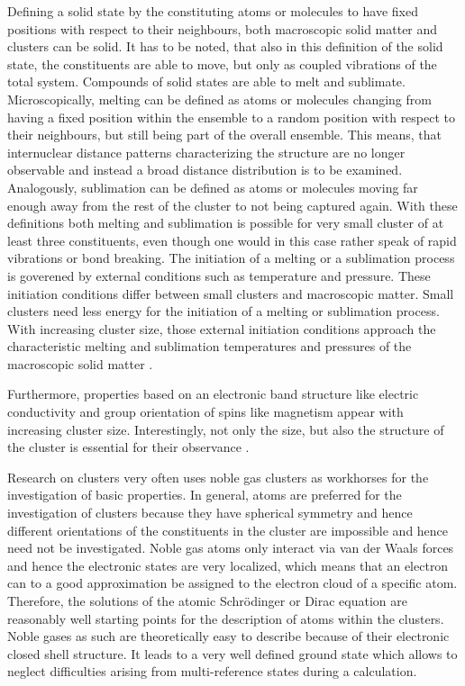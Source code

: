 Defining a solid state by the constituting atoms or molecules to have fixed
positions with respect to their neighbours, both macroscopic solid matter
and clusters can be solid. It has to be noted, that also in this definition
of the solid state, the constituents are able to move, but only as coupled
vibrations of the total system.
Compounds of solid states are able to melt and sublimate. Microscopically, melting 
can be defined as atoms or                                       
molecules changing from having a fixed position within the ensemble to a          
random position with respect to their neighbours, but still being part
of the overall ensemble. This means, that internuclear distance
patterns characterizing the
structure are no longer observable and instead a broad distance distribution
is to be examined.
Analogously, sublimation can be defined as atoms or molecules         
moving far enough away from the rest of the cluster to not being captured         
again.
With these definitions both melting and sublimation is possible for very
small cluster of at least three constituents, even though one would in this
case rather speak of rapid vibrations or bond breaking.
The initiation of a melting or a sublimation process is goverened by
external conditions such as temperature and pressure. These initiation
conditions differ between small clusters and macroscopic matter. Small clusters
need less energy for the initiation of a melting or sublimation process.
With increasing cluster size, those external initiation conditions
approach the characteristic melting and sublimation temperatures and pressures
of the macroscopic solid matter
\cite{Kaelberer77,Verkhovtseva03}. 

Furthermore, properties based on an electronic band structure like
electric conductivity and group orientation of spins like magnetism appear
with increasing cluster size. Interestingly, not only the size, but also the
structure of the cluster is essential for their observance
\cite{Benfield92}.

Research on clusters very often uses noble gas clusters as workhorses for
the investigation of basic properties.
In general, atoms are preferred for the investigation of clusters because
they have spherical symmetry and hence different orientations of the constituents
in the cluster are impossible and hence need not be investigated.
Noble gas atoms only interact via
van der Waals forces and hence the electronic states are very localized, which means
that an electron can to a good approximation be
assigned to the electron cloud of a specific atom.
Therefore, the solutions of the atomic Schrödinger or Dirac equation
are reasonably well starting points for the
description of atoms within the
clusters. 
Noble gases as such are theoretically easy to describe because of their
electronic closed shell structure.
It leads to a very well
defined ground state which allows to neglect difficulties arising from
multi-reference states during a calculation.

